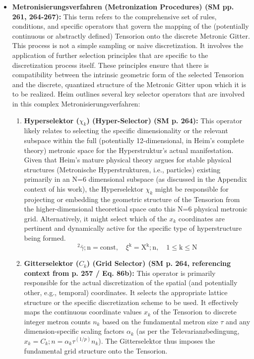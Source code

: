 \documentclass[12pt]{article}
\newcommand{\metron}{\tau}
\begin{document}
\begin{itemize}
    \item \textbf{Metronisierungsverfahren (Metronization Procedures) (SM pp. 261, 264-267):}
    This term refers to the comprehensive set of rules, conditions, and specific operators that govern the mapping of the (potentially continuous or abstractly defined) Tensorion onto the discrete Metronic Gitter. This process is not a simple sampling or naive discretization. It involves the application of further selection principles that are specific to the discretization process itself. These principles ensure that there is compatibility between the intrinsic geometric form of the selected Tensorion and the discrete, quantized structure of the Metronic Gitter upon which it is to be realized. Heim outlines several key selector operators that are involved in this complex Metronisierungsverfahren:
    \begin{enumerate}
        \item \textbf{Hyperselektor (\( \chi_k \)) (Hyper-Selector) (SM p. 264):} This operator likely relates to selecting the specific dimensionality or the relevant subspace within the full (potentially 12-dimensional, in Heim's complete theory) metronic space for the Hyperstruktur's actual manifestation. Given that Heim's mature physical theory argues for stable physical structures (Metronische Hyperstrukturen, i.e., particles) existing primarily in an N=6 dimensional subspace (as discussed in the Appendix context of his work), the Hyperselektor \( \chi_k \) might be responsible for projecting or embedding the geometric structure of the Tensorion from the higher-dimensional theoretical space onto this N=6 physical metronic grid. Alternatively, it might select which of the \( x_k \) coordinates are pertinent and dynamically active for the specific type of hyperstructure being formed.
        \begin{equation}
        {}^2\bar{\gamma};\mathrm{n} = \text{const}, \quad \xi^\mathrm{k} = \mathrm{X^k};\mathrm{n}, \quad 1 \le \mathrm{k} \le \mathrm{N} \tag{86a}
        \end{equation}
        \item \textbf{Gitterselektor (\( C_k \)) (Grid Selector) (SM p. 264, referencing context from p. 257 / Eq. 86b):} This operator is primarily responsible for the actual discretization of the spatial (and potentially other, e.g., temporal) coordinates. It selects the appropriate lattice structure or the specific discretization scheme to be used. It effectively maps the continuous coordinate values \( x_k \) of the Tensorion to discrete integer metron counts \( n_k \) based on the fundamental metron size \( \metron \) and any dimension-specific scaling factors \( \alpha_k \) (as per the Televarianzbedingung, \( x_k = C_k ; n = \alpha_k \tau^{(1/p)} n_k \)). The Gitterselektor thus imposes the fundamental grid structure onto the Tensorion.

\end{enumerate}
\end{itemize}
\end{document}
